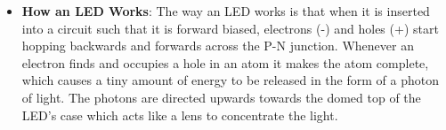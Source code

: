 \documentclass{report}
\begin{document}
\begin{itemize}
            \bigbreak \noindent 
            The conical shape of the cup reflects the light emitted from the semiconductor die upwards. This is why LEDs appear brighter if you view them from above rather than the side. A wire bond connects the Post and the Anvil
        \item \textbf{How an LED Works}: The way an LED works is that when it is inserted into a circuit such that it is forward biased, electrons (-) and holes (+) start hopping backwards and forwards across the P-N junction. Whenever an electron finds and occupies a hole in an atom it makes the atom complete, which causes a tiny amount of energy to be released in the form of a photon of light.
            \bigbreak \noindent 
            The photons are directed upwards towards the domed top of the LED's case which acts like a lens to concentrate the light.


    \end{itemize}
\end{document}
